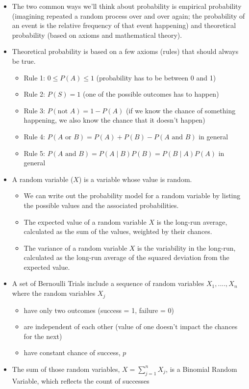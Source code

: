 \documentclass[
]{book}
\providecommand{\tightlist}{%
  \setlength{\itemsep}{0pt}\setlength{\parskip}{0pt}}
\begin{document}
\begin{itemize}
\item
  The two common ways we'll think about probability is empirical probability (imagining repeated a random process over and over again; the probability of an event is the relative frequency of that event happening) and theoretical probability (based on axioms and mathematical theory).
\item
  Theoretical probability is based on a few axioms (rules) that should always be true.

  \begin{itemize}
  \tightlist
  \item
    Rule 1: \(0\leq P(A)\leq 1\) (probability has to be between 0 and 1)
  \item
    Rule 2: \(P(S) = 1\) (one of the possible outcomes has to happen)
  \item
    Rule 3: \(P(\text{not }A) = 1 - P(A)\) (if we know the chance of something happening, we also know the chance that it doesn't happen)
  \item
    Rule 4: \(P(A\text{ or }B) = P(A) + P(B) - P(A\text{ and } B)\) in general
  \item
    Rule 5: \(P(A\text{ and }B) = P(A \mid B)P(B) = P(B \mid A)P(A)\) in general
  \end{itemize}
\item
  A random variable (\(X\)) is a variable whose value is random.

  \begin{itemize}
  \tightlist
  \item
    We can write out the probability model for a random variable by listing the possible values and the associated probabilities.
  \item
    The expected value of a random variable \(X\) is the long-run average, calculated as the sum of the values, weighted by their chances.
  \item
    The variance of a random variable \(X\) is the variability in the long-run, calculated as the long-run average of the squared deviation from the expected value.
  \end{itemize}
\item
  A set of Bernoulli Trials include a sequence of random variables \(X_1,....,X_n\) where the random variables \(X_j\)

  \begin{itemize}
  \tightlist
  \item
    have only two outcomes (success = 1, failure = 0)
  \item
    are independent of each other (value of one doesn't impact the chances for the next)
  \item
    have constant chance of success, \(p\)
  \end{itemize}
\item
  The sum of those random variables, \(X = \sum_{j=1}^n X_j\), is a Binomial Random Variable, which reflects the count of successes


\end{itemize}
\end{document}
